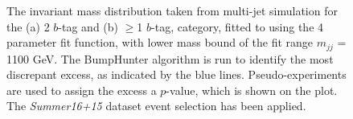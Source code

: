 \begin{figure}[!ht]
  \begin{center}
   \captionsetup[subfigure]{aboveskip=0pt,justification=centering}
  \end{center}
  \caption{ The invariant mass distribution taken from multi-jet simulation for the (a) 2 $b$-tag and (b) $\geq$1 $b$-tag,
   category, fitted to using the 4 parameter fit function, with lower mass bound of the fit range $m_{jj}$ = 1100 GeV.
   The BumpHunter algorithm is run to identify the most discrepant excess, as indicated by the blue lines.
   Pseudo-experiments are used to assign the excess a $p$-value, which is shown on the plot.    
   The \textit{Summer16+15} dataset event selection has been applied.}
 \label{fig:Short_4para_1100_figure1}
\end{figure}


